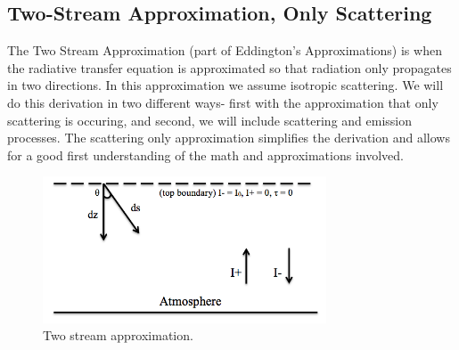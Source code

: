 \documentclass{article}
\begin{document}
 
 \subsection*{Two-Stream Approximation, Only Scattering}
 The Two Stream Approximation (part of Eddington's Approximations) is when the radiative transfer equation is approximated so that radiation only propagates in two directions. In this approximation we assume isotropic scattering.
 We will do this derivation in two different ways- first with the approximation that only scattering is occuring, and second, we will include scattering and emission processes. The scattering only approximation simplifies the derivation and allows for a good first understanding of the math and approximations involved.
 
\begin{figure}
    \centering
    \includegraphics[width=0.75\textwidth]{figures/Twostream2.png}
    \caption{Two stream approximation. }
    \label{fig:twostream}
\end{figure} %
\end{document}
